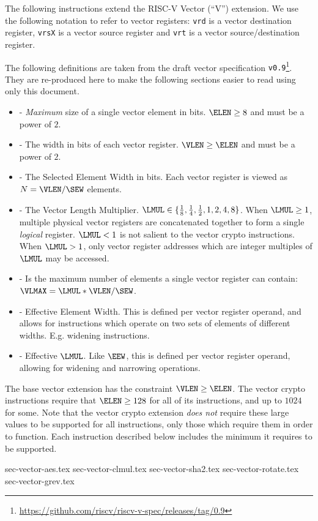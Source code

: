 
The following instructions extend the RISC-V Vector (``V'') extension.
We use the following notation to refer to vector registers:
{\tt vrd}  is a vector        destination register,
{\tt vrsX} is a vector source             register
and
{\tt vrt}  is a vector source/destination register.

The following definitions are taken from the draft
vector specification {\tt v0.9}\footnote{\url{https://github.com/riscv/riscv-v-spec/releases/tag/0.9}}.
They are re-produced here to make the following sections easier to
read using only this document.

\begin{itemize}
\item[\ELEN] - {\em Maximum} size of a single vector element in bits.
              $\ELEN \ge 8$ and must be a power of $2$.
\item[\VLEN] - The width in bits of each vector register.
              $\VLEN \ge \ELEN$ and must be a power of $2$.
\item[\SEW]  - The Selected Element Width in bits.
              Each vector register is viewed as $N=\VLEN/\SEW$ elements.
\item[\LMUL] - The Vector Length Multiplier.
              $\LMUL\in\{{1\over 8},{1\over 4},{1\over 2},1,2,4,8\}$.
              When $\LMUL\ge1$, multiple physical vector registers are
              concatenated together to form a single {\em logical} register.
              $\LMUL<1$ is not salient to the vector crypto instructions.
              When $\LMUL>1$, only vector register addresses which are
              integer multiples of $\LMUL$ may be accessed.
\item[\VLMAX]- Is the maximum number of elements a single vector register
              can contain: $\VLMAX=\LMUL*\VLEN/\SEW$.
\item[\EEW]  - Effective Element Width. This is defined per vector register
              operand, and allows for instructions which operate on
              two sets of elements of different widths. E.g. widening
              instructions.
\item[\EMUL] - Effective $\LMUL$. Like $\EEW$, this is defined per vector
              register operand, allowing for widening and narrowing
              operations.
\end{itemize}

The base vector extension has the constraint $\VLEN \ge \ELEN$.
The vector crypto instructions require that $\ELEN \ge 128$ for all
of its instructions, and up to $1024$ for some.
Note that the vector crypto extension {\em does not} require these
large \ELEN values to be supported for all instructions, only those
which require them in order to function.
Each instruction described below includes the minimum \ELEN it
requires to be supported.


{sec-vector-aes.tex}
{sec-vector-clmul.tex}
{sec-vector-sha2.tex}
{sec-vector-rotate.tex}
{sec-vector-grev.tex}

